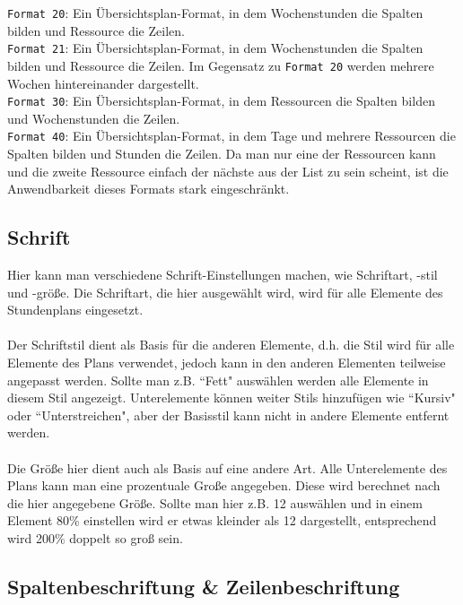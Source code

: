 \noindent
\texttt{Format 20}: Ein Übersichtsplan-Format, in dem Wochenstunden die Spalten bilden und Ressource die Zeilen.\\

\noindent
\texttt{Format 21}: Ein Übersichtsplan-Format, in dem Wochenstunden die Spalten bilden und Ressource die Zeilen. Im Gegensatz zu \texttt{Format 20} werden mehrere Wochen hintereinander dargestellt.\\

\noindent
\texttt{Format 30}: Ein Übersichtsplan-Format, in dem Ressourcen die Spalten bilden und Wochenstunden die Zeilen.\\

\noindent
\texttt{Format 40}: Ein Übersichtsplan-Format, in dem Tage und mehrere Ressourcen die Spalten bilden und Stunden die Zeilen. Da man nur eine der Ressourcen kann und die zweite Ressource einfach der nächste aus der List zu sein scheint, ist die Anwendbarkeit dieses Formats stark eingeschränkt.\\

\subsection{Schrift}
\label{sec:schrift}

Hier kann man verschiedene Schrift-Einstellungen machen, wie Schriftart, -stil und -größe. Die Schriftart, die hier ausgewählt wird, wird für alle Elemente des Stundenplans eingesetzt.\\
\\
Der Schriftstil dient als Basis für die anderen Elemente, d.h. die Stil wird für alle Elemente des Plans verwendet, jedoch kann in den anderen Elementen teilweise angepasst werden. Sollte man z.B. ``Fett" \hspace{1pt} auswählen werden alle Elemente in diesem Stil angezeigt. Unterelemente können weiter Stils hinzufügen wie ``Kursiv" \hspace{1pt} oder ``Unterstreichen", aber der Basisstil kann nicht in andere Elemente entfernt werden.\\
\\
Die Größe hier dient auch als Basis auf eine andere Art. Alle Unterelemente des Plans kann man eine prozentuale Große angegeben. Diese wird berechnet nach die hier angegebene Größe. Sollte man hier z.B. 12 auswählen und in einem Element 80\% einstellen wird er etwas kleinder als 12 dargestellt, entsprechend wird 200\% doppelt so groß sein.

\subsection{Spaltenbeschriftung \& Zeilenbeschriftung}

